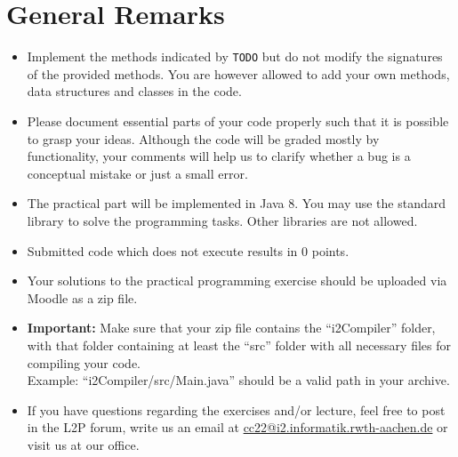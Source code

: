 \documentclass[a4paper]{article}
\begin{document}

\section*{General Remarks}
\begin{itemize}
  \item Implement the methods indicated by \texttt{TODO} but do not modify the signatures of the provided methods. You are however allowed to add your own methods, data structures and classes in the code.
  \item Please document essential parts of your code properly such that it is possible to grasp your ideas. Although the code will be graded mostly by functionality, your comments will help us to clarify whether a bug is a conceptual mistake or just a small error.
  \item The practical part will be implemented in Java 8. You may use the standard library to solve the programming tasks. Other libraries are not allowed.
  \item Submitted code which does not execute results in 0 points.
  \item Your solutions to the practical programming exercise should be uploaded via Moodle as a zip file.
  \item \textbf{Important:} Make sure that your zip file contains the ``i2Compiler'' folder, with that folder containing at least the ``src'' folder with all necessary files for compiling your code.\\Example: ``i2Compiler/src/Main.java'' should be a valid path in your archive.
  \item If you have questions regarding the exercises and/or lecture, feel free to post in the L2P forum, write us an email at \href{mailto:cc22@i2.informatik.rwth-aachen.de}{cc22@i2.informatik.rwth-aachen.de} or visit us at our office.
\end{itemize}
\end{document}
